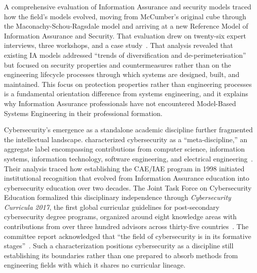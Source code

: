 A comprehensive evaluation of Information Assurance and security models traced how the field's models evolved, moving from McCumber's original cube through the Maconachy-Schou-Ragsdale model and arriving at a new Reference Model of Information Assurance and Security. That evaluation drew on twenty-six expert interviews, three workshops, and a case study~\parencite{Cherdantseva_2016}. That analysis revealed that existing IA models addressed ``trends of diversification and de-perimeterisation'' but focused on security properties and countermeasures rather than on the engineering lifecycle processes through which systems are designed, built, and maintained. This focus on protection properties rather than engineering processes is a fundamental orientation difference from systems engineering, and it explains why Information Assurance professionals have not encountered Model-Based Systems Engineering in their professional formation.

Cybersecurity's emergence as a standalone academic discipline further fragmented the intellectual landscape. \citeauthor{Parrish_2018} characterized cybersecurity as a ``meta-discipline,'' an aggregate label encompassing contributions from computer science, information systems, information technology, software engineering, and electrical engineering~\parencite{Parrish_2018}. Their analysis traced how establishing the CAE/IAE program in 1998 initiated institutional recognition that evolved from Information Assurance education into cybersecurity education over two decades. The Joint Task Force on Cybersecurity Education formalized this disciplinary independence through \textit{Cybersecurity Curricula 2017}, the first global curricular guidelines for post-secondary cybersecurity degree programs, organized around eight knowledge areas with contributions from over three hundred advisors across thirty-five countries~\parencite{CSEC2017}. The committee report acknowledged that ``the field of cybersecurity is in its formative stages''~\parencite{CSEC2017}. Such a characterization positions cybersecurity as a discipline still establishing its boundaries rather than one prepared to absorb methods from engineering fields with which it shares no curricular lineage.

